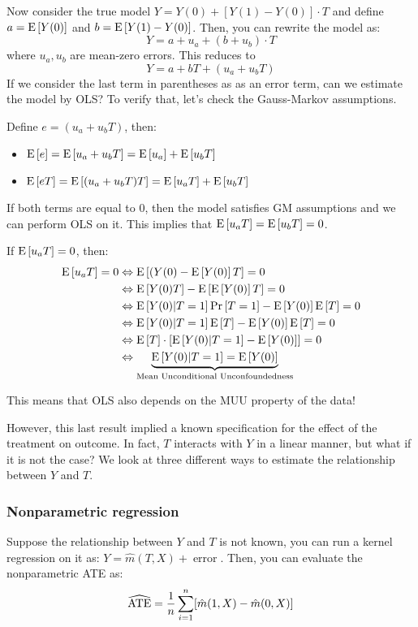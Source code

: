 Now consider the true model $Y = Y(0) + [Y(1) - Y(0)]\cdot T $ and define $a = \operatorname{E}\left[Y(0)\right]$ and $b = \operatorname{E}\left[Y(1) - Y(0)\right]$. Then, you can rewrite the model as: $$Y = a + u_a + (b + u_b)\cdot T $$ where $u_a, u_b$ are mean-zero errors. This reduces to $$Y = a + bT + (u_a + u_bT) $$ If we consider the last term in parentheses as as an error term, can we estimate the model by OLS? To verify that, let's check the Gauss-Markov assumptions.

Define $e = (u_a + u_bT)$, then:\begin{itemize}
\item $\operatorname{E}\left[e\right] = \operatorname{E}\left[u_a + u_bT\right] = \operatorname{E}\left[u_a\right] + \operatorname{E}\left[u_bT\right]$
\item $\operatorname{E}\left[eT\right] = \operatorname{E}\left[(u_a + u_bT)T\right] = \operatorname{E}\left[u_aT\right] + \operatorname{E}\left[u_bT\right]$
\end{itemize}
If both terms are equal to 0, then the model satisfies GM assumptions and we can perform OLS on it. This implies that $\operatorname{E}\left[u_aT\right] = \operatorname{E}\left[u_bT\right] = 0$.

If $\operatorname{E}\left[u_aT\right] = 0$, then:\begin{align*}
\operatorname{E}\left[u_aT\right] = 0 & \Leftrightarrow \operatorname{E}\left[(Y(0) - \operatorname{E}\left[Y(0)\right]T\right] = 0 \\ & \Leftrightarrow \operatorname{E}\left[Y(0)T\right] - \operatorname{E}\left[\operatorname{E}\left[Y(0)\right]T\right] = 0 \\ & \Leftrightarrow \operatorname{E}\left[Y(0)\vert T=1\right]\operatorname{Pr}\left[T =1\right] - \operatorname{E}\left[Y(0)\right]\operatorname{E}\left[T\right] = 0 \\& \Leftrightarrow \operatorname{E}\left[Y(0)\vert T=1\right]\operatorname{E}\left[T\right] - \operatorname{E}\left[Y(0)\right]\operatorname{E}\left[T\right] = 0 \\ & \Leftrightarrow \operatorname{E}\left[T\right]\cdot [ \operatorname{E}\left[Y(0)\vert T=1\right] - \operatorname{E}\left[Y(0)\right]] = 0\\ & \Leftrightarrow \underbrace{\operatorname{E}\left[Y(0)\vert T=1\right] = \operatorname{E}\left[Y(0)\right]}_{\text{Mean Unconditional Unconfoundedness}}
\end{align*}

This means that OLS also depends on the MUU property of the data!

However, this last result implied a known specification for the effect of the treatment on outcome. In fact, $T$ interacts with $Y$ in a linear manner, but what if it is not the case? We look at three different ways to estimate the relationship between $Y$ and $T$.

\subsubsection{Nonparametric regression}

Suppose the relationship between $Y$ and $T$ is not known, you can run a kernel regression on it as: $Y = \hat m(T,X) + \operatorname{error}$. Then, you can evaluate the nonparametric ATE as: $$\widehat{\operatorname{ATE}} = \frac{1}{n} \sum_{i=1}^{n}[\hat m(1,X) - \hat m(0,X)] $$

